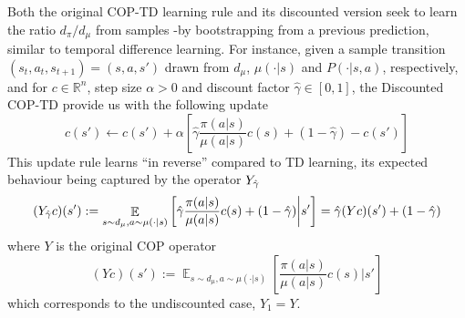 \documentclass[12pt,a4paper,openright,twoside]{article}
\DeclareMathOperator*{\E}{\mathbb{E}}
\numberwithin{equation}{section}
\theoremstyle{definition}
\theoremstyle{remark}
\theoremstyle{plain}
\begin{document}
Both the original COP-TD learning rule\cite{COPTD} and its discounted version\cite{DCOPTD} seek to learn the ratio $d_\pi / d_\mu$ from samples -by bootstrapping from a previous prediction, similar to temporal difference learning. For instance, given a sample transition $(s_t,a_t,s_{t+1}) = (s,a,s')$ drawn from $d_\mu$, $\mu(\cdot|s)$ and $P(\cdot|s,a)$, respectively, and for $c\in \mathbb{R}^n$, step size $\alpha>0$ and discount factor $\hat{\gamma} \in [0,1]$, the Discounted COP-TD provide us with the following update
\begin{equation} \label{DCOP}
    c(s') \leftarrow c(s') + \alpha \left[\hat{\gamma} \frac{\pi(a|s)}{\mu(a|s)}c(s) + (1-\hat{\gamma}) - c(s') \right]
\end{equation}
This update rule learns “in reverse” compared to TD learning, its expected behaviour being captured by the operator $Y_{\Hat{\gamma}}$
\begin{equation} \label{DCOPoperator}
    (Y_{\Hat{\gamma}}c)(s') := \E_{s \sim d_\mu, a \sim \mu(\cdot|s)} \left[ \hat{\gamma} \frac{\pi(a|s)}{\mu(a|s)}c(s) + (1-\hat{\gamma}) \bigg| s' \right] = \hat{\gamma} (Yc)(s') + (1-\hat{\gamma})
\end{equation}
where $Y$ is the original COP operator 
\begin{equation} \label{COPoperator}
    (Yc)(s') := \E_{s \sim d_\mu, a \sim \mu(\cdot|s)} \left[ \frac{\pi(a|s)}{\mu(a|s)}c(s)  \bigg| s' \right]
\end{equation}
which corresponds to the undiscounted case, $Y_1=Y$.
\end{document}
